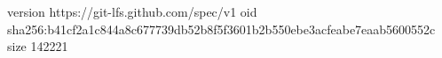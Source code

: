version https://git-lfs.github.com/spec/v1
oid sha256:b41cf2a1c844a8c677739db52b8f5f3601b2b550ebe3acfeabe7eaab5600552c
size 142221
